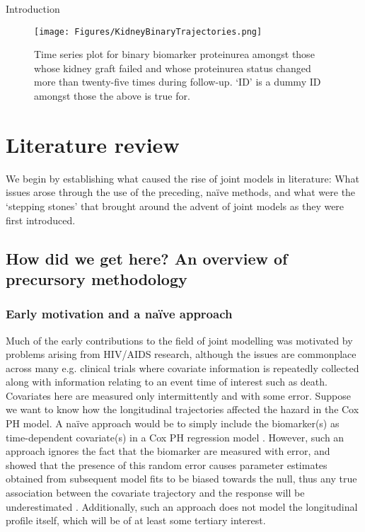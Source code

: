 \begin{chapter}{\label{cha:intro}Introduction}
  \begin{figure}[t]
      \centering
      \texttt{[image: Figures/KidneyBinaryTrajectories.png]}
      \caption{Time series plot for binary biomarker proteinurea amongst those whose kidney graft failed and whose proteinurea status changed more than twenty-five times during follow-up. `ID' is a dummy ID amongst those the above is true for.}
      \label{fig:Kidneyprot}
  \end{figure}
  
  \section{\label{sec:lit}Literature review}
  We begin by establishing what caused the rise of joint models in literature: What issues arose through the use of the preceding, na\"{i}ve methods, and what were the `stepping stones' that brought around the advent of joint models as they were first introduced.
  \subsection{\label{sec:lit-early}How did we get here? An overview of precursory methodology}
  \subsubsection*{Early motivation and a na\"{i}ve approach}
  \addtocounter{subsubsection}{1}
  Much of the early contributions to the field of joint modelling was motivated by problems arising from HIV/AIDS research, although the issues are commonplace across many e.g. clinical trials where covariate information is repeatedly collected along with information relating to an event time of interest such as death. Covariates here are measured only intermittently and with some error. Suppose we want to know how the longitudinal trajectories affected the hazard in the Cox PH model. A na\"{i}ve approach would be to simply include the biomarker(s) as time-dependent covariate(s) in a Cox PH regression model \citep{Andersen1982}. However, such an approach ignores the fact that the biomarker are measured with error, and \citet{Prentice1982} showed that the presence of this random error causes parameter estimates obtained from subsequent model fits to be biased towards the null, thus any true association between the covariate trajectory and the response will be underestimated \citep{Sweeting2011}. Additionally, such an approach does not model the longitudinal profile itself, which will be of at least some tertiary interest.
  

\end{chapter}
